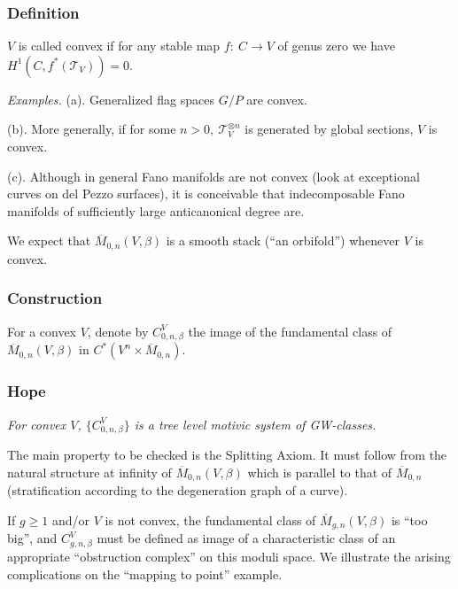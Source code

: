 \documentclass[reqno]{amsart}
\theoremstyle{definition}
\begin{document}

\subsubsection{Definition}
  $V$ is called
  convex if for
  any stable map $f:\ C\to V$ of genus zero
  we have
  $H^1(C,f^*(\mathcal{T}_V))=0$.


\textit{Examples.}
(a). Generalized flag spaces $G/P$ are convex.

(b). More generally, if for some $n>0,\ \mathcal{T}_V^{\otimes n}$
is generated by global sections, $V$ is convex.

(c). Although in general Fano manifolds are not convex
(look at exceptional curves on del Pezzo surfaces), it is
conceivable that indecomposable Fano manifolds of sufficiently large
anticanonical degree are.


We expect that ${\overline{M}}_{0,n}(V,\beta )$ is a smooth stack
(``an orbifold'') whenever $V$ is convex.


\subsubsection{Construction}
For a convex $V$, denote
by $C^V_{0,n,\beta}$ the image of the fundamental class
of ${\overline{M}}_{0,n}(V,\beta )$ in $C^*(V^n\times
{\overline{M}}_{0,n})$.


\subsubsection{Hope}
{\it
  For convex $V$, $\{ C^V_{0,n,\beta}\}$
  is a tree level motivic system of GW-classes.
}

\smallskip

The main property to be checked is the Splitting Axiom. It must
follow from the natural structure at infinity of
${\overline{M}}_{0,n}(V,\beta )$ which is parallel to that
of ${\overline{M}}_{0,n}$ (stratification according to the
degeneration graph of a curve).

\smallskip

If $g\ge 1$ and/or $V$ is not convex,  the fundamental
class of ${\overline{M}}_{g,n}(V,\beta )$ is ``too big'', and
$C^V_{g,n,\beta }$ must be defined as image of a characteristic
class of an appropriate ``obstruction complex'' on
this moduli space. We illustrate the arising complications
on the ``mapping to point'' example.
\end{document}
